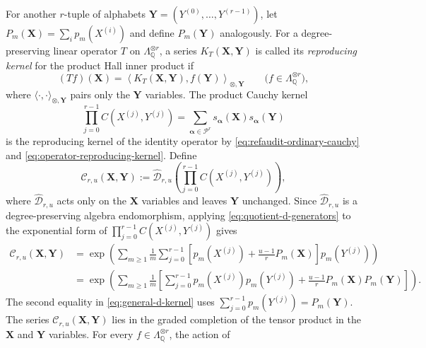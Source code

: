 \documentclass[12pt,reqno,a4paper]{amsart}
\numberwithin{equation}{section}
\numberwithin{figure}{section}
\theoremstyle{plain}
\theoremstyle{definition}
\begin{document}
For another $r$-tuple of alphabets
$\mathbf Y=(Y^{(0)},\ldots,Y^{(r-1)})$, let
$P_m(\mathbf X)=\sum_i p_m(X^{(i)})$ and define
$P_m(\mathbf Y)$ analogously.  For a degree-preserving linear operator
$T$ on $\Lambda_{\mathbb Q}^{\otimes r}$, a series
$K_T(\mathbf X,\mathbf Y)$ is called its \emph{reproducing kernel}
for the product Hall inner product if
\begin{equation}\label{eq:operator-reproducing-kernel}
 (Tf)(\mathbf X)
 =\left\langle
   K_T(\mathbf X,\mathbf Y),f(\mathbf Y)
  \right\rangle_{\otimes,\mathbf Y}
 \qquad
 \bigl(f\in\Lambda_{\mathbb Q}^{\otimes r}\bigr),
\end{equation}
where $\langle\cdot,\cdot\rangle_{\otimes,\mathbf Y}$ pairs only
the $\mathbf Y$ variables.  The product Cauchy kernel
\begin{equation}\label{eq:refaudit-product-cauchy-kernel}
 \prod_{j=0}^{r-1}C(X^{(j)},Y^{(j)})
 =\sum_{\boldsymbol\alpha\in\mathscr P^r}
   s_{\boldsymbol\alpha}(\mathbf X)
   s_{\boldsymbol\alpha}(\mathbf Y)
\end{equation}
is the reproducing kernel of the identity operator by
\eqref{eq:refaudit-ordinary-cauchy} and
\eqref{eq:operator-reproducing-kernel}.  Define
\[
 \mathcal C_{r,u}(\mathbf X,\mathbf Y)
 :=\widehat{\mathcal D}_{r,u}\left(
     \prod_{j=0}^{r-1}C(X^{(j)},Y^{(j)})\right),
\]
where $\widehat{\mathcal D}_{r,u}$ acts only on the $\mathbf X$
variables and leaves $\mathbf Y$ unchanged.  Since
$\widehat{\mathcal D}_{r,u}$ is a degree-preserving algebra endomorphism,
applying \eqref{eq:quotient-d-generators} to the exponential form of
$\prod_{j=0}^{r-1}C(X^{(j)},Y^{(j)})$ gives
\begin{equation}\label{eq:general-d-kernel}
\begin{aligned}
 \mathcal C_{r,u}(\mathbf X,\mathbf Y)
 &=\exp\left(
   \sum_{m\geq1}\frac1m\sum_{j=0}^{r-1}
   \left[p_m(X^{(j)})+\frac{u-1}{r}P_m(\mathbf X)\right]
   p_m(Y^{(j)})\right)\\
 &=\exp\left(
  \sum_{m\geq1}\frac1m
  \left[
   \sum_{j=0}^{r-1}p_m(X^{(j)})p_m(Y^{(j)})
   +\frac{u-1}{r}P_m(\mathbf X)P_m(\mathbf Y)
  \right]
 \right).
\end{aligned}
\end{equation}
The second equality in \eqref{eq:general-d-kernel} uses
$\sum_{j=0}^{r-1}p_m(Y^{(j)})=P_m(\mathbf Y)$.
The series $\mathcal C_{r,u}(\mathbf X,\mathbf Y)$ lies in the
graded completion of the tensor product in the $\mathbf X$ and
$\mathbf Y$ variables.  For every
$f\in\Lambda_{\mathbb Q}^{\otimes r}$, the action of
\end{document}
